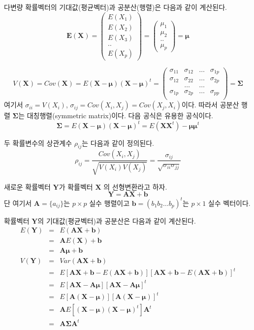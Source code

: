 \documentclass[
]{book}
\theoremstyle{definition}
\theoremstyle{definition}
\theoremstyle{definition}
\theoremstyle{remark}
\begin{document}
다변량 확률벡터의 기대값(평균벡터)과 공분산(행렬)은 다음과 같이 계산된다.
\begin{equation*}
\bm E(\bm X) =
  \begin{pmatrix}
E(X_1) \\
E(X_2) \\
E(X_3) \\
..  \\
E(X_p)
\end{pmatrix}
= 
  \begin{pmatrix}
\mu_1 \\
\mu_2 \\
..  \\
\mu_p
\end{pmatrix}
=\bm \mu
\end{equation*}

\begin{equation*}
V(\bm X) =Cov(\bm X) = E (\bm X-\bm \mu) (\bm X-\bm \mu)^t 
= 
  \begin{pmatrix}
\sigma_{11} & \sigma_{12} & \dots & \sigma_{1p} \\
\sigma_{12} & \sigma_{22} & \dots & \sigma_{2p} \\
& \dots & \dots & \\
\sigma_{1p} & \sigma_{2p} & \dots & \sigma_{pp} \\
\end{pmatrix}
= \bm \Sigma
\end{equation*}
여기서 \(\sigma_{ii}=V(X_i)\), \(\sigma_{ij} = Cov(X_i, X_j)=Cov(X_j, X_i)\)이다. 따라서 공분산 행렬
\(\bm \Sigma\)는 대칭행렬(symmetric matrix)이다. 다음 공식은 유용한 공식이다.
\[ \bm \Sigma = E (\bm X-\bm \mu) (\bm X-\bm \mu)^t  = E(\bm X \bm X^t)-\bm \mu \bm \mu^t \]

두 확률변수의 상관계수 \(\rho_{ij}\)는 다음과 같이 정의된다.
\[ \rho_{ij} = \frac{Cov(X_i, X_j)}{ \sqrt{V(X_i) V(X_j)}} = \frac{\sigma_{ij}}{\sqrt{\sigma_{ii}
  \sigma_{jj}}} \]

새로운 확률벡터 \(\bm Y\)가 확률벡터 \(\bm X\) 의 선형변환라고 하자.
\[ \bm Y = \bm A  \bm X + \bm b \]
단 여기서 \(\bm A = \{ a_{ij} \}\)는 \(p \times p\) 실수 행렬이고
\(\bm b =(b_1 b_2 \dots b_p)^t\)는 \(p \times 1\) 실수 벡터이다.

확률벡터 \(\bm Y\)의 기대값(평균벡터)과 공분산은 다음과 같이 계산된다.
\begin{eqnarray*}
E(\bm Y ) &=& E(\bm A \bm X+ \bm b) \\
&=& \bm A E(\bm X)+ \bm b \\
&=& \bm A \bm \mu+ \bm b \\
V(\bm Y) &=& Var(\bm A \bm X+ \bm b) \\
&=& E[\bm A \bm X+ \bm b -E(\bm A \bm X+ \bm b)] [\bm A \bm X+ \bm b -E(\bm A \bm X+ \bm b)]^t \\
&=& E[\bm A \bm X -  \bm A \bm \mu] [\bm A \bm X -  \bm A \bm \mu]^t \\
&=& E[\bm A (\bm X - \bm \mu)] [\bm A (\bm X - \bm \mu)]^t \\
&=& \bm A E [(\bm X - \bm \mu) (\bm X - \bm \mu)^t] \bm A^t \\
&=& \bm A \bm \Sigma \bm A^t
\end{eqnarray*}
\end{document}
